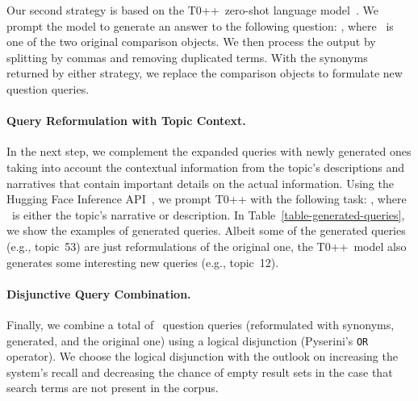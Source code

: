 Our second strategy is based on the T0++~zero-shot language model~\cite{SanhWRBSACSLRDBXTSSKCNDCJWMSYPBWNRSSFFTBGBWR2021}.
We prompt the model to generate an answer to the following question: , where ~is one of the two original comparison objects. 
We then process the output by splitting by commas and removing duplicated terms.
With the synonyms returned by either strategy, we replace the comparison objects to formulate new question queries.

\paragraph{Query Reformulation with Topic Context.}


In the next step, we complement the expanded queries with newly generated ones taking into account the contextual information from the topic's descriptions and narratives that
contain important details on the actual information.
Using the Hugging Face Inference API~\cite{WolfDSCDMCRLFDSPMJPXSGDLR2020}, we prompt T0++ with the following task: , where ~is either the topic's narrative or description. 
In Table~\ref{table-generated-queries}, we show the examples of generated queries.
Albeit some of the generated queries (e.g., topic~53) are just reformulations of the original one, the T0++~model also generates some interesting new queries (e.g., topic~12).

\paragraph{Disjunctive Query Combination.}

Finally, we combine a total of ~question queries (reformulated with synonyms, generated, and the original one) using a logical disjunction (Pyserini's \texttt{OR} operator).
We choose the logical disjunction with the outlook on increasing the system's recall and decreasing the chance of empty result sets in the case that search terms are not present in the corpus.

